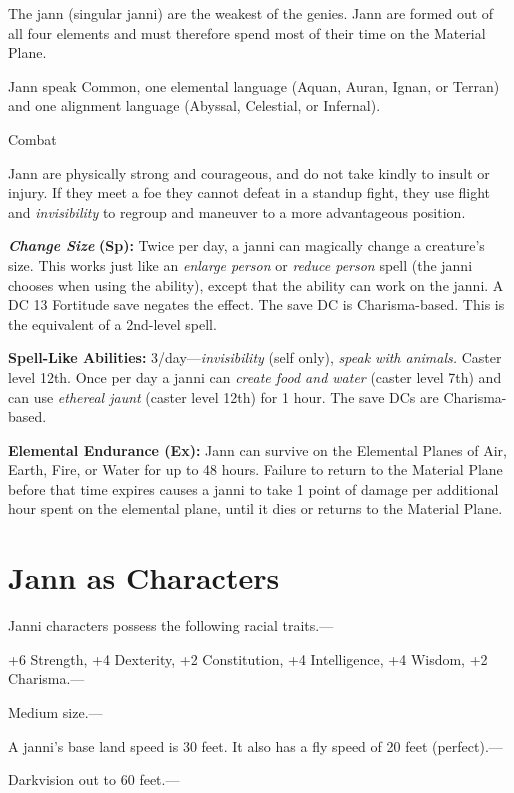 \documentclass{article}
\begin{document}
The jann (singular janni) are the weakest of the genies. Jann are formed out of 
all four elements and must therefore spend most of their time on the Material Plane. 

Jann speak Common, one elemental language (Aquan, Auran, Ignan, or Terran) and 
one alignment language (Abyssal, Celestial, or Infernal).

Combat

Jann are physically strong and courageous, and do not take kindly to insult or 
injury. If they meet a foe they cannot defeat in a standup fight, they use flight 
and \textit{invisibility }to regroup and maneuver to a more advantageous position.

\textit{\textbf{Change Size }}\textbf{(Sp): }Twice per day, a janni can magically 
change a creature's size. This works just like an \textit{enlarge person }or \textit{reduce 
person }spell (the janni chooses when using the ability), except that the ability 
can work on the janni. A DC 13 Fortitude save negates the effect. The save DC is 
Charisma-based. This is the equivalent of a 2nd-level spell.

\textbf{Spell-Like Abilities:} 3/day---\textit{invisibility }(self only), \textit{speak 
with animals. }Caster level 12th. Once per day a janni can \textit{create food 
and water }(caster level 7th) and can use \textit{ethereal jaunt }(caster level 
12th) for 1 hour. The save DCs are Charisma-based.

\textbf{Elemental Endurance (Ex):} Jann can survive on the Elemental Planes of 
Air, Earth, Fire, or Water for up to 48 hours. Failure to return to the Material 
Plane before that time expires causes a janni to take 1 point of damage per additional 
hour spent on the elemental plane, until it dies or returns to the Material Plane.

\section*{\textbf{Jann as Characters}}

Janni characters possess the following racial traits.--- 

\parindent=3pt
+6 Strength, +4 Dexterity, +2 Constitution, +4 Intelligence, +4 Wisdom, +2 Charisma.---

\parindent=0pt
Medium size.---

A janni's base land speed is 30 feet. It also has a fly speed of 20 feet (perfect).---

Darkvision out to 60 feet.---
\end{document}
